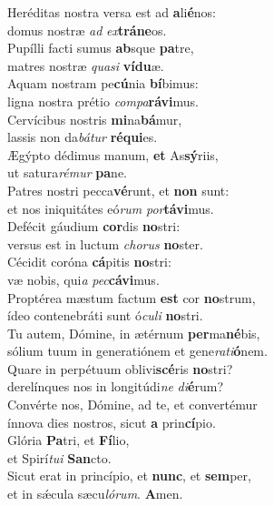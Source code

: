 \evenverse Heréditas nostra versa est ad \textbf{a}li\textbf{é}nos:~\*\\
\evenverse domus nostræ \textit{ad} \textit{ex}\textbf{trá}\textbf{ne}os.\\
\oddverse Pupílli facti sumus \textbf{ab}sque \textbf{pa}tre,~\*\\
\oddverse matres nostræ \textit{qua}\textit{si} \textbf{ví}\textbf{du}æ.\\
\evenverse Aquam nostram pe\textbf{cú}nia \textbf{bí}bimus:~\*\\
\evenverse ligna nostra prétio \textit{com}\textit{pa}\textbf{rá}\textbf{vi}mus.\\
\oddverse Cervícibus nostris \textbf{mi}na\textbf{bá}mur,~\*\\
\oddverse lassis non da\textit{bá}\textit{tur} \textbf{ré}\textbf{qui}es.\\
\evenverse Ægýpto dédimus manum, \textbf{et} As\textbf{sý}riis,~\*\\
\evenverse ut satura\textit{ré}\textit{mur} \textbf{pa}ne.\\
\oddverse Patres nostri pecca\textbf{vé}runt, et \textbf{non} sunt:~\*\\
\oddverse et nos iniquitátes eó\textit{rum} \textit{por}\textbf{tá}\textbf{vi}mus.\\
\evenverse Defécit gáudium \textbf{cor}dis \textbf{no}stri:~\*\\
\evenverse versus est in luctum \textit{cho}\textit{rus} \textbf{no}ster.\\
\oddverse Cécidit coróna \textbf{cá}pitis \textbf{no}stri:~\*\\
\oddverse væ nobis, qui\textit{a} \textit{pec}\textbf{cá}\textbf{vi}mus.\\
\evenverse Proptérea mæstum factum \textbf{est} cor \textbf{no}strum,~\*\\
\evenverse ídeo contenebráti sunt ó\textit{cu}\textit{li} \textbf{no}stri.\\
\oddverse Tu autem, Dómine, in ætérnum \textbf{per}ma\textbf{né}bis,~\*\\
\oddverse sólium tuum in generatiónem et gene\textit{ra}\textit{ti}\textbf{ó}nem.\\
\evenverse Quare in perpétuum oblivi\textbf{scé}ris \textbf{no}stri?~\*\\
\evenverse derelínques nos in longitúdi\textit{ne} \textit{di}\textbf{é}rum?\\
\oddverse Convérte nos, Dómine, ad te, et convertémur~\*\\
\oddverse ínnova dies nostros, sicut \textbf{a} prin\textbf{cí}pio.\\
\evenverse Glória \textbf{Pa}tri, et \textbf{Fí}lio,~\*\\
\evenverse et Spirí\textit{tu}\textit{i} \textbf{San}cto.\\
\oddverse Sicut erat in princípio, et \textbf{nunc}, et \textbf{sem}per,~\*\\
\oddverse et in sǽcula sæcu\textit{ló}\textit{rum}. \textbf{A}men.\\
